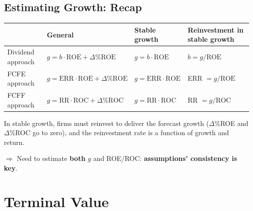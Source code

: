 \subsection{Estimating Growth: Recap}
\begin{center}
\small
\setlength{\tabcolsep}{4pt}\begin{tabular}{@{}llll@{}}
\toprule
& \textbf{General} & \textbf{Stable growth} & \textbf{Reinvestment in stable growth}\\
\midrule
Dividend approach & $g=b\cdot\text{ROE}+\Delta\%\text{ROE}$ & $g=b\cdot\text{ROE}$ & $b=g/\text{ROE}$\\
FCFE approach & $g=\text{ERR}\cdot\text{ROE}+\Delta\%\text{ROE}$ & $g=\text{ERR}\cdot\text{ROE}$ & ERR $=g/\text{ROE}$\\
FCFF approach & $g=\text{RR}\cdot\text{ROC}+\Delta\%\text{ROC}$ & $g=\text{RR}\cdot\text{ROC}$ & RR $=g/\text{ROC}$\\
\bottomrule
\end{tabular}
\end{center}
In stable growth, firms must reinvest to deliver the forecast growth ($\Delta\%$ROE and $\Delta\%$ROC go to zero), and the reinvestment rate is a function of growth and return.
\begin{keybox}
$\Longrightarrow$ Need to estimate \textbf{both} $g$ and ROE/ROC: \textbf{assumptions' consistency is key}.
\end{keybox}

\section{Terminal Value}

